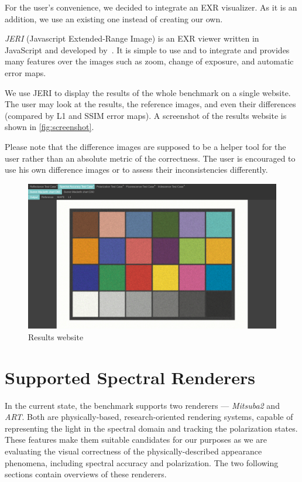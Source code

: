 For the user's convenience, we decided to integrate an EXR visualizer. As it is an addition, we use an existing one instead of creating our own.

\emph{JERI} (Javascript Extended-Range Image) is an EXR viewer written in \\JavaScript and developed by~\citet{jeriWeb}. It is simple to use and to integrate and provides many features over the images such as zoom, change of exposure, and automatic error maps.

We use JERI to display the results of the whole benchmark on a single website. The user may look at the results, the reference images, and even their differences (compared by L1 and SSIM error maps). A screenshot of the results website is shown in \autoref{fig:screenshot}.

Please note that the difference images are supposed to be a helper tool for the user rather than an absolute metric of the correctness. The user is encouraged to use his own difference images or to assess their inconsistencies differently.

\begin{figure}
	\centering
	\includegraphics[width=\linewidth]{img/screenshot.png}
	\caption{Results website}
	\label{fig:screenshot}
\end{figure}

\section{Supported Spectral Renderers}

In the current state, the benchmark supports two renderers --- \emph{Mitsuba2} and \emph{ART}. Both are physically-based, research-oriented rendering systems, capable of representing the light in the spectral domain and tracking the polarization states. These features make them suitable candidates for our purposes as we are evaluating the visual correctness of the physically-described appearance phenomena, including spectral accuracy and polarization. The two following sections contain overviews of these renderers.

